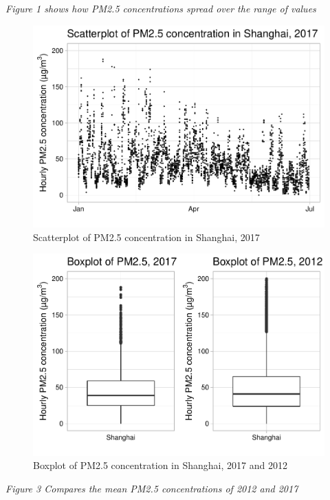\documentclass[12pt,]{article}
\begin{document}
\emph{Figure 1 shows how PM2.5 concentrations spread over the range of
values}

\begin{figure}
\centering
\includegraphics{Project_Template_files/figure-latex/Exploratory graph 2-1.pdf}
\caption{Scatterplot of PM2.5 concentration in Shanghai, 2017}
\end{figure}

\begin{figure}
\centering
\includegraphics{Project_Template_files/figure-latex/Exploratory graph 3-1.pdf}
\caption{Boxplot of PM2.5 concentration in Shanghai, 2017 and 2012}
\end{figure}

\emph{Figure 3 Compares the mean PM2.5 concentrations of 2012 and 2017}
\end{document}
